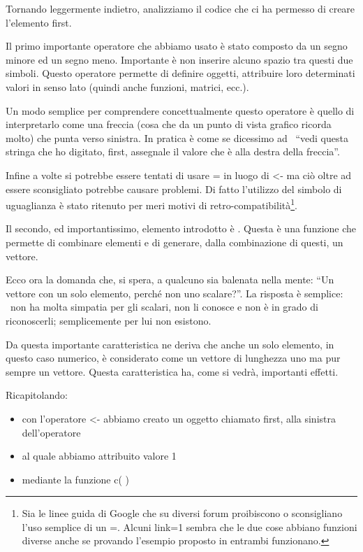 Tornando leggermente indietro, analizziamo il codice che ci ha permesso di creare l'elemento first.

Il primo importante operatore che abbiamo usato è stato \cod{<-} composto da un segno minore ed un segno meno. Importante è non inserire alcuno spazio tra questi due simboli. Questo operatore permette di definire oggetti, attribuire loro determinati valori in senso lato (quindi anche funzioni, matrici, ecc.).

Un modo semplice per comprendere concettualmente questo operatore è quello di interpretarlo come una freccia (cosa che da un punto di vista grafico ricorda molto) che punta verso sinistra. In pratica è come se dicessimo ad \erre\ ``vedi questa stringa che ho digitato, first, assegnale il valore che è alla destra della freccia''.

Infine a volte si potrebbe essere tentati di usare = in luogo di <- ma ciò oltre ad essere sconsigliato potrebbe causare problemi. Di fatto l'utilizzo del simbolo di uguaglianza è stato ritenuto per meri motivi di retro-compatibilità\footnote{Sia le linee guida di Google che su diversi forum proibiscono o sconsigliano l'uso semplice di un =. Alcuni link=1 sembra che le due cose abbiano funzioni diverse anche se provando l'esempio proposto in \erre entrambi funzionano.}.

Il secondo, ed importantissimo, elemento introdotto è . Questa è una funzione che permette di combinare elementi e di generare, dalla combinazione di questi, un vettore.

Ecco ora la domanda che, si spera, a qualcuno sia balenata nella mente: ``Un vettore con un solo elemento, perché non uno scalare?''. La risposta è semplice: \erre\ non ha molta simpatia per gli scalari, non li conosce e non è in grado di riconoscerli; semplicemente per lui non esistono.

Da questa importante caratteristica ne deriva che anche un solo elemento, in questo caso numerico, è considerato come un vettore di lunghezza uno ma pur sempre un vettore. Questa caratteristica ha, come si vedrà, importanti effetti.

Ricapitolando:
\begin{itemize}
\item con l'operatore <- abbiamo creato un oggetto chiamato first, alla sinistra dell'operatore
\item al quale abbiamo attribuito valore 1
\item mediante la funzione c( )
\end{itemize}

